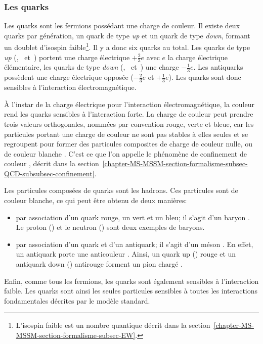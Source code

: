 \subsubsection{Les quarks}\label{chapter-MS-MSSM-section-SM_ptcs-subsec-fermions-subsubsec-quarks}
Les quarks sont les fermions possédant une charge de couleur.
Il existe deux quarks par génération, un quark de type \emph{up} et un quark de type \emph{down}, formant un doublet d'isospin faible\footnote{L'isospin faible est un nombre quantique décrit dans la section~\ref{chapter-MS-MSSM-section-formalisme-subsec-EW}.}. Il y a donc six quarks au total. Les quarks de type \emph{up} (\quarku, \quarkc\ et~\quarkt) portent une charge électrique $+\frac{2}{3}e$ avec $e$ la charge électrique élémentaire, les quarks de type \emph{down} (\quarkd, \quarks\ et~\quarkb) une charge $-\frac{1}{3}e$. Les antiquarks possèdent une charge électrique opposée ($-\frac{2}{3}e$ et $+\frac{1}{3}e$). Les quarks sont donc sensibles à l'interaction électromagnétique.
\par À l'instar de la charge électrique pour l'interaction électromagnétique, la \og couleur \fg rend les quarks sensibles à l'interaction forte. La charge de couleur peut prendre trois valeurs orthogonales, nommées par convention rouge, verte et bleue, car les particules portant une charge de couleur ne sont pas stables à elles seules et se regroupent pour former des particules composites de charge de couleur nulle, ou de couleur \og blanche \fg. C'est ce que l'on appelle le phénomène de \og confinement de couleur \fg, décrit dans la section~\ref{chapter-MS-MSSM-section-formalisme-subsec-QCD-subsubsec-confinement}.
\par Les particules composées de quarks sont les hadrons. Ces particules sont de couleur blanche, ce qui peut être obtenu de deux manières:
\begin{itemize}
\item par association d'un quark rouge, un vert et un bleu; il s'agit d'un \og baryon \fg. Le proton (\quarku\quarku\quarkd) et le neutron (\quarku\quarkd\quarkd) sont deux exemples de baryons.
\item par association d'un quark et d'un antiquark; il s'agit d'un \og méson \fg. En effet, un antiquark porte une \og anticouleur \fg. Ainsi, un quark up (\quarku) rouge et un antiquark down (\antiquarkd) \og antirouge \fg{} forment un pion chargé \pionplus.
\end{itemize}
\par Enfin, comme tous les fermions, les quarks sont également sensibles à l'interaction faible. Les quarks sont ainsi les seules particules sensibles à toutes les interactions fondamentales décrites par le modèle standard.

